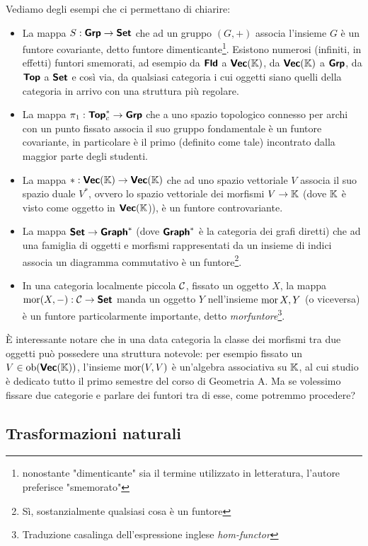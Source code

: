 \documentclass{article}
\begin{document}
Vediamo degli esempi che ci permettano di chiarire:\begin{itemize}
    \item La mappa $S:\text{\sffamily\textbf{Grp}} \to \text{\sffamily\textbf{Set}}$ che ad un gruppo $(G,+)$ associa l'insieme $G$ è un funtore covariante, detto funtore dimenticante\footnote{nonostante "dimenticante" sia il termine utilizzato in letteratura, l'autore preferisce "smemorato"}. Esistono numerosi (infiniti, in effetti) funtori smemorati, ad esempio da $\text{\sffamily\textbf{Fld}}$ a $\text{\sffamily\textbf{Vec}}(\mathbb{K})$, da $\text{\sffamily\textbf{Vec}}(\mathbb{K})$ a $\text{\sffamily\textbf{Grp}}$, da $\text{\sffamily\textbf{Top}}$ a $\text{\sffamily\textbf{Set}}$ e così via, da qualsiasi categoria i cui oggetti siano quelli della categoria in arrivo con una struttura più regolare.
    \item La mappa $\pi_1 : \text{\sffamily\textbf{Top}}_c^* \to \text{\sffamily\textbf{Grp}}$ che a uno spazio topologico connesso per archi con un punto fissato associa il suo gruppo fondamentale è un funtore covariante, in particolare è il primo (definito come tale) incontrato dalla maggior parte degli studenti.
    \item La mappa $*:\text{\sffamily\textbf{Vec}}(\mathbb{K}) \to \text{\sffamily\textbf{Vec}}(\mathbb{K}) $ che ad uno spazio vettoriale $V$ associa il suo spazio duale $V^*$, ovvero lo spazio vettoriale dei morfismi $V \to \mathbb{K}$ (dove $\mathbb{K}$ è visto come oggetto in $\text{\sffamily\textbf{Vec}}(\mathbb{K}$)), è un funtore controvariante.
    \item La mappa $\text{\sffamily\textbf{Set}} \to \text{\sffamily\textbf{Graph}}^*$ (dove $\text{\sffamily\textbf{Graph}}^*$ è la categoria dei grafi diretti) che ad una famiglia di oggetti e morfismi rappresentati da un insieme di indici associa un diagramma commutativo è un funtore\footnote{Sì, sostanzialmente qualsiasi cosa è un funtore}.
    \item In una categoria localmente piccola $\mathcal{C}$, fissato un oggetto $X$, la mappa $\operatorname{mor}(X,-):\mathcal{C}\to\text{\sffamily\textbf{Set}}$ manda un oggetto $Y$ nell'insieme $\operatorname{mor}{X,Y}$ (o viceversa) è un funtore particolarmente importante, detto \textit{morfuntore}\footnote{Traduzione casalinga dell'espressione inglese \textit{hom-functor}}.
\end{itemize}

È interessante notare che in una data categoria la classe dei morfismi tra due oggetti può possedere una struttura notevole: per esempio fissato un $V \in \operatorname{ob}(\text{\sffamily\textbf{Vec}}(\mathbb{K}))$, l'insieme $\operatorname{mor}(V,V)$ è un'algebra associativa su $\mathbb{K}$, al cui studio è dedicato tutto il primo semestre del corso di Geometria A. Ma se volessimo fissare due categorie e parlare dei funtori tra di esse, come potremmo procedere?

\subsection{Trasformazioni naturali}
\end{document}
